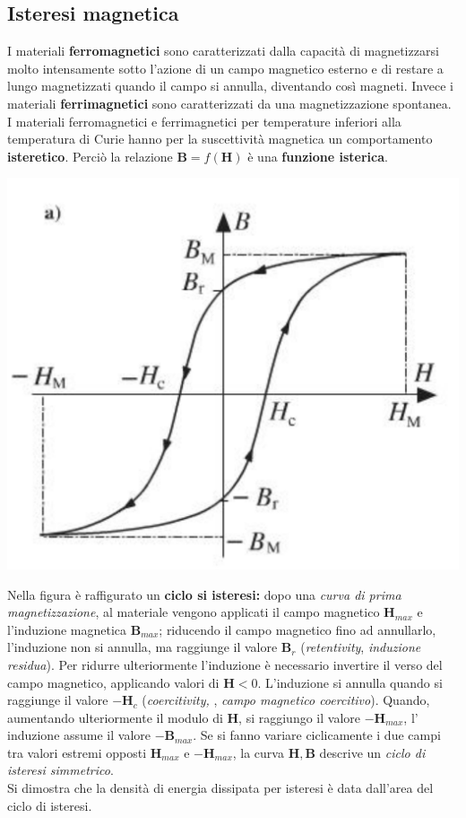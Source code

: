 \documentclass{article}
\begin{document}
\subsection{Isteresi magnetica}
I materiali \textbf{ferromagnetici} sono caratterizzati dalla capacità di magnetizzarsi molto intensamente sotto l'azione di un campo magnetico esterno e di restare a lungo magnetizzati quando il campo si annulla, diventando così magneti. Invece i materiali \textbf{ferrimagnetici} sono caratterizzati da una magnetizzazione spontanea.
\vspace*{0.1cm}\\
I materiali ferromagnetici e ferrimagnetici per temperature inferiori alla temperatura di Curie hanno per la suscettività magnetica un comportamento \textbf{isteretico}. Perciò la relazione $\mathbf{B} = f(\mathbf{H})$ è una \textbf{funzione isterica}.\\
\begin{center}
    \includegraphics[scale=0.27]{Image/Isteresi_magnetica_2.png}
\end{center}
Nella figura è raffigurato un \textbf{ciclo si isteresi:} dopo una \textit{curva di prima magnetizzazione}, al materiale vengono applicati il campo magnetico $\mathbf{H}_{max}$ e l'induzione magnetica $\mathbf{B}_{max}$; riducendo il campo magnetico fino ad annullarlo, l'induzione non si annulla, ma raggiunge il valore $\mathbf{B}_r$ (\textit{retentivity}, \textit{induzione residua}). Per ridurre ulteriormente l'induzione è necessario invertire il verso del campo magnetico, applicando valori di $\mathbf{H}<0$. L'induzione si annulla quando si raggiunge il valore $-\mathbf{H}_c$ (\textit{coercitivity, }, \textit{campo magnetico coercitivo}). Quando, aumentando ulteriormente il modulo di $\mathbf{H}$, si raggiungo il valore $-\mathbf{H}_{max}$, l' induzione assume il valore $-\mathbf{B}_{max}$. Se si fanno variare ciclicamente i due campi tra valori estremi opposti $\mathbf{H}_{max}$ e $-\mathbf{H}_{max}$, la curva $\mathbf{H},\mathbf{B}$ descrive un \textit{ciclo di isteresi simmetrico}.
\vspace*{0.1cm}\\
Si dimostra che la densità di energia dissipata per isteresi è data dall'area del ciclo di isteresi.
\end{document}
